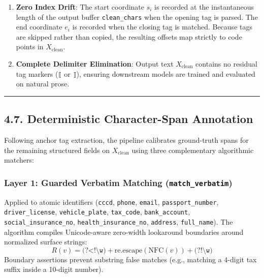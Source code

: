 \documentclass[
]{article}
\providecommand{\tightlist}{%
  \setlength{\itemsep}{0pt}\setlength{\parskip}{0pt}}
\begin{document}
\begin{enumerate}
\def\labelenumi{\arabic{enumi}.}
\tightlist
\item
  \textbf{Zero Index Drift}: The start coordinate \(s_i\) is recorded at
  the instantaneous length of the output buffer \texttt{clean\_chars}
  when the opening tag is parsed. The end coordinate \(e_i\) is recorded
  when the closing tag is matched. Because tags are skipped rather than
  copied, the resulting offsets map strictly to code points in
  \(X_{\text{clean}}\).
\item
  \textbf{Complete Delimiter Elimination}: Output text
  \(X_{\text{clean}}\) contains no residual tag markers (\texttt{⟦} or
  \texttt{⟧}), ensuring downstream models are trained and evaluated on
  natural prose.
\end{enumerate}

\begin{center}\rule{0.5\linewidth}{0.5pt}\end{center}

\subsection{4.7. Deterministic Character-Span
Annotation}\label{deterministic-character-span-annotation}

Following anchor tag extraction, the pipeline calibrates ground-truth
spans for the remaining structured fields on \(X_{\text{clean}}\) using
three complementary algorithmic matchers:

\subsubsection{\texorpdfstring{Layer 1: Guarded Verbatim Matching
(\texttt{match\_verbatim})}{Layer 1: Guarded Verbatim Matching (match\_verbatim)}}\label{layer-1-guarded-verbatim-matching-match_verbatim}

Applied to atomic identifiers (\texttt{cccd}, \texttt{phone},
\texttt{email}, \texttt{passport\_number}, \texttt{driver\_license},
\texttt{vehicle\_plate}, \texttt{tax\_code}, \texttt{bank\_account},
\texttt{social\_insurance\_no}, \texttt{health\_insurance\_no},
\texttt{address}, \texttt{full\_name}). The algorithm compiles
Unicode-aware zero-width lookaround boundaries around normalized surface
strings:
\[R(v) = \texttt{(?<!\textbackslash{}w)} + \text{re.escape}(\text{NFC}(v)) + \texttt{(?!\textbackslash{}w)}\]
Boundary assertions prevent substring false matches (e.g., matching a
4-digit tax suffix inside a 10-digit number).
\end{document}
